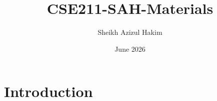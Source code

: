 \documentclass{article}
\title{CSE211-SAH-Materials}
\author{Sheikh Azizul Hakim}
\date{June 2026}
\begin{document}
\maketitle

\section{Introduction}
\end{document}
